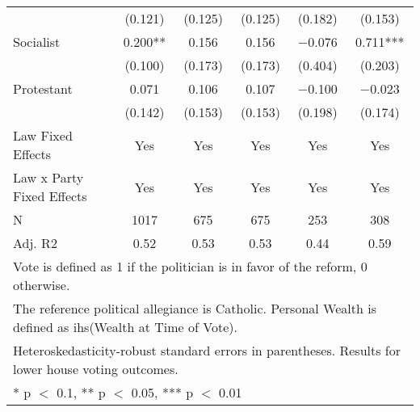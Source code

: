 \begin{table}[!h]
{\begin{tabular}[t]{lccccc}
 & (\num{0.121}) & (\num{0.125}) & (\num{0.125}) & (\num{0.182}) & (\num{0.153})\\
Socialist & \num{0.200}** & \num{0.156} & \num{0.156} & \num{-0.076} & \num{0.711}***\\
 & (\num{0.100}) & (\num{0.173}) & (\num{0.173}) & (\num{0.404}) & (\num{0.203})\\
Protestant & \num{0.071} & \num{0.106} & \num{0.107} & \num{-0.100} & \num{-0.023}\\
 & (\num{0.142}) & (\num{0.153}) & (\num{0.153}) & (\num{0.198}) & (\num{0.174})\\
\midrule
Law Fixed Effects & Yes & Yes & Yes & Yes & Yes\\
Law x Party Fixed Effects & Yes & Yes & Yes & Yes & Yes\\
N & \num{1017} & \num{675} & \num{675} & \num{253} & \num{308}\\
Adj. R2 & \num{0.52} & \num{0.53} & \num{0.53} & \num{0.44} & \num{0.59}\\
\bottomrule
\multicolumn{6}{l}{\rule{0pt}{1em}Vote is defined as 1 if the politician is in favor of the reform, 0 otherwise.}\\
\multicolumn{6}{l}{\rule{0pt}{1em}The reference political allegiance is Catholic. Personal Wealth is defined as ihs(Wealth at Time of Vote).}\\
\multicolumn{6}{l}{\rule{0pt}{1em}Heteroskedasticity-robust standard errors in parentheses. Results for lower house voting outcomes.}\\
\multicolumn{6}{l}{\rule{0pt}{1em}* p $<$ 0.1, ** p $<$ 0.05, *** p $<$ 0.01}\\
\end{tabular}}
\end{table}
